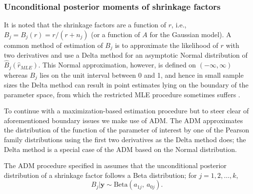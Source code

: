 \documentclass[article]{jss}
\begin{document}
\subsubsection{Unconditional posterior moments of shrinkage factors}  It is noted that  the shrinkage factors  are a function of $r$, i.e., $B_{j}= B_{j}(r)=r/(r+n_{j})$ (or a function of $A$ for the Gaussian model). A common method of estimation of $B_{j}$ is to approximate the likelihood of $r$ with two derivatives and use  a Delta method for an asymptotic Normal distribution of $\hat{B}_{j}(\hat{r}_{MLE})$. This Normal approximation, however, is defined on $(-\infty, \infty)$ whereas $B_{j}$ lies on the unit interval between 0 and 1, and hence in small sample sizes the Delta method can result in point estimates lying on the boundary of the parameter space, from which the restricted MLE procedure sometimes suffers \citep{tang2011, kelly2014advances}.

To continue with a maximization-based estimation procedure but to steer clear of aforementioned boundary issues we make use of  ADM. The ADM approximates the distribution of the function of the parameter of interest by one of the Pearson family distributions using the first two derivatives as the Delta method does; the Delta method is a special case of the ADM based on the Normal distribution. 


The ADM procedure specified in \cite{tang2011} assumes that the unconditional posterior distribution of a shrinkage factor follows a Beta distribution; for $j=1, 2, \ldots, k$,
\begin{equation}\label{admshrinkage}
B_j\vert\boldsymbol{y}\sim \textrm{Beta}(a_{1j},~ a_{0j}).
\end{equation}
\end{document}
